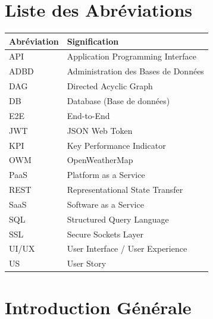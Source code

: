 \documentclass[a4paper,12pt,oneside]{report}
\begin{document}
\newpage

\chapter*{Liste des Abréviations}

\begin{tabularx}{\textwidth}{lX}
\toprule
\textbf{Abréviation} & \textbf{Signification} \\
\midrule
API     & Application Programming Interface \\
ADBD    & Administration des Bases de Données \\
DAG     & Directed Acyclic Graph \\
DB      & Database (Base de données) \\
E2E     & End-to-End \\
JWT     & JSON Web Token \\
KPI     & Key Performance Indicator \\
OWM     & OpenWeatherMap \\
PaaS    & Platform as a Service \\
REST    & Representational State Transfer \\
SaaS    & Software as a Service \\
SQL     & Structured Query Language \\
SSL     & Secure Sockets Layer \\
UI/UX   & User Interface / User Experience \\
US      & User Story \\
\bottomrule
\end{tabularx}

\newpage

\tableofcontents
\newpage
\listoffigures
{}
\newpage
\listoftables
{}
\newpage

\chapter{Introduction Générale}
\end{document}
